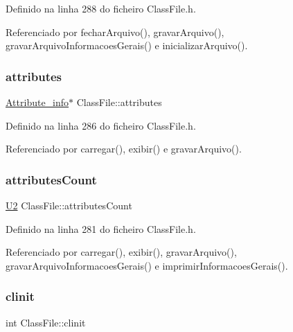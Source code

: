 Definido na linha 288 do ficheiro Class\+File.\+h.



Referenciado por fechar\+Arquivo(), gravar\+Arquivo(), gravar\+Arquivo\+Informacoes\+Gerais() e inicializar\+Arquivo().

\mbox{\label{classClassFile_a20d4b18030becbd8df5b7584477e94b6}} 
\subsubsection{\texorpdfstring{attributes}{attributes}}
{\footnotesize\ttfamily \hyperlink{structAttribute__info}{Attribute\+\_\+info}$\ast$ Class\+File\+::attributes\hspace{0.3cm}{\ttfamily [private]}}



Definido na linha 286 do ficheiro Class\+File.\+h.



Referenciado por carregar(), exibir() e gravar\+Arquivo().

\mbox{\label{classClassFile_a66691e77df3f8604eebebc8759953542}} 
\subsubsection{\texorpdfstring{attributes\+Count}{attributesCount}}
{\footnotesize\ttfamily \hyperlink{BasicTypes_8h_a90240657108b1b457eef9d3f76e0202e}{U2} Class\+File\+::attributes\+Count\hspace{0.3cm}{\ttfamily [private]}}



Definido na linha 281 do ficheiro Class\+File.\+h.



Referenciado por carregar(), exibir(), gravar\+Arquivo(), gravar\+Arquivo\+Informacoes\+Gerais() e imprimir\+Informacoes\+Gerais().

\mbox{\label{classClassFile_aa1eb77ebbd737bde7edde5fbdb2b6992}} 
\subsubsection{\texorpdfstring{clinit}{clinit}}
{\footnotesize\ttfamily int Class\+File\+::clinit\hspace{0.3cm}{\ttfamily [private]}}



